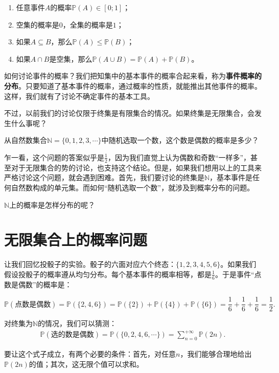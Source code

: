 \documentclass[12pt,UTF8]{ctexbook}
\begin{document}
\begin{enumerate}
    \item 任意事件$A$的概率$\mathbb{P}(A)\in[0;1]$；
    \item 空集的概率是$0$，全集的概率是$1$；
    \item 如果$A\subseteq B$，那么$\mathbb{P}(A)\leqslant \mathbb{P}(B)$；
    \item 如果$A\cap B$是空集，那么$\mathbb{P}(A\cup B) = \mathbb{P}(A) + \mathbb{P}(B)$。
\end{enumerate}

如何讨论事件的概率？我们把知集中的基本事件的概率合起来看，称为\textbf{事件概率的分布}。只要知道了基本事件的概率，通过概率的性质，就能推出其他事件的概率。这样，我们就有了讨论不确定事件的基本工具。

不过，以前我们的讨论仅限于终集是有限集合的情况。如果终集是无限集合，会发生什么事呢？

\begin{ex}
    从自然数集合$\mathbb{N} = \{0,1,2,3,\cdots\}$中随机选取一个数，这个数是偶数的概率是多少？
\end{ex}

乍一看，这个问题的答案似乎是$\frac{1}{2}$，因为我们直觉上认为偶数和奇数“一样多”，甚至对于无限集合的势的讨论，也支持这个结论。但是，如果我们想用以上的工具来严格讨论这个问题，就会遇到困难。首先，我们要讨论的终集是$\mathbb{N}$，基本事件是任何自然数构成的单元集。而如何“随机选取一个数”，就涉及到概率分布的问题。

$\mathbb{N}$上的概率是怎样分布的呢？

\section{无限集合上的概率问题}

让我们回忆投骰子的实验。骰子的六面对应六个终态：$\{1,2,3,4,5,6\}$。如果我们假设投骰子的概率遵从均匀分布。每个基本事件的概率相等，都是$\frac{1}{6}$。于是事件“点数是偶数”的概率是：

$$ \mathbb{P}(\mbox{点数是偶数}) = \mathbb{P}(\{2,4,6\}) = \mathbb{P}(\{2\}) + \mathbb{P}(\{4\}) + \mathbb{P}(\{6\}) = \frac{1}{6} + \frac{1}{6} + \frac{1}{6} = \frac{1}{2}.$$

对终集为$\mathbb{N}$的情况，我们可以猜测：
\begin{align*}
    \mathbb{P}(\mbox{选的数是偶数}) = \mathbb{P}(\{0,2,4,6,\cdots\}) = \sum_{n=0}^{+\infty} \mathbb{P}(2n).
\end{align*}

要让这个式子成立，有两个必要的条件：首先，对任意$n$，我们能够合理地给出$\mathbb{P}(2n)$的值；其次，这无限个值可以求和。
\end{document}
